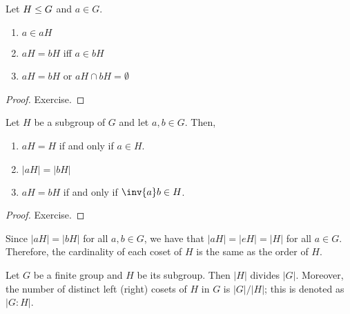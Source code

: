\documentclass[11pt]{penrose}
\begin{document}
\begin{nthm}
    Let $H \mathrel{\leq} G$ and $a \in G$.
    \begin{enumerate}
        \item $a \in aH$
        \item $aH = bH$ iff $a \in bH$
        \item $aH = bH$ or $aH \cap bH = \emptyset$
    \end{enumerate}
\end{nthm}
\begin{proof}
    Exercise.
\end{proof}

\begin{nthm}
    Let $H$ be a subgroup of $G$ and let $a, b \in G$. Then,
    \begin{enumerate}
        \item $aH = H$ if and only if $a \in H$.
        \item $|aH| = |bH|$
        \item $aH = bH$ if and only if $\inv{a} b \in H$.
    \end{enumerate}
\end{nthm}
\begin{proof}
    Exercise.
\end{proof}

\begin{remark}
    Since $|aH| = |bH|$ for all $a, b \in G$, we have that $|aH| = |eH| = |H|$ for all $a \in G$. Therefore, the cardinality of each coset of $H$ is the same as the order of $H$.
\end{remark}

\begin{nthm}
    Let $G$ be a finite group and $H$ be its subgroup. Then $|H|$ divides $|G|$. Moreover, the number of distinct left (right) cosets of $H$ in $G$ is $|G|/|H|$; this is denoted as $|G:H|$.
\end{nthm}
\end{document}
